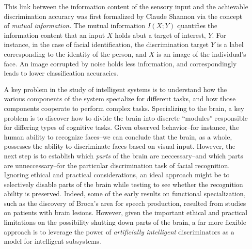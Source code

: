 This link between the information content of the sensory input and the
achievable discrimination accuracy was first formalized by Claude
Shannon via the concept of \emph{mutual information.}  The mutual
information $I(X; Y)$ quantifies the information content that an input
$X$ holds abut a target of interest, $Y$.  For instance, in the case
of facial identification, the discrimination target $Y$ is a label
corresponding to the identity of the person, and $X$ is an image of
the individual's face.  An image corrupted by noise holds less
information, and correspondingly leads to lower classification
accuracies.


A key problem in the study of intelligent systems is to understand how
the various components of the system specialize for different tasks,
and how those components cooperate to perform complex tasks.
Specializing to the brain, a key problem is to discover how to divide
the brain into discrete ``modules'' responsible for differing types of
cognitive tasks.  Given observed behavior--for instance, the human
ability to recognize faces--we can conclude that the brain, as a
whole, possesses the ability to discriminate faces based on visual
input.  However, the next step is to establish which \emph{parts} of
the brain are neccessary--and which parts are unneccessary--for the
particular discrimination task of facial recognition.  Ignoring
ethical and practical considerations, an ideal approach might be to
selectively disable parts of the brain while testing to see whether
the recognition ability is preserved.  Indeed, some of the early
results on functional specialization, such as the discovery of Broca's
area for speech production, resulted from studies on patients with
brain lesions.  However, given the important ethical and practical
limitations on the possibility shutting down parts of the brain, a far
more flexible approach is to leverage the power of \emph{artificially
  intelligent} discriminators as a model for intelligent subsystems. 




